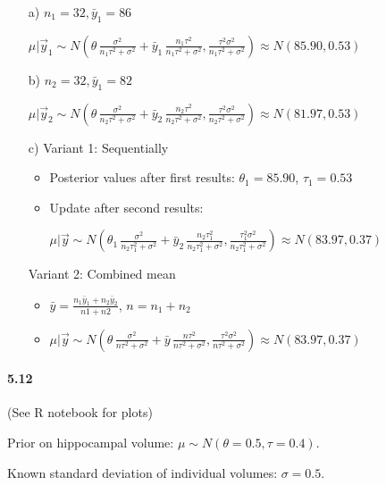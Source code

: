 \documentclass[fontsize=11pt,DIV=18,parskip=half]{scrartcl}
\begin{document}
\begin{enumerate}
\item[a)] $n_1 = 32, \bar{y}_1 = 86$

$\mu|\vec{y}_1 \sim N\left(\theta \, \frac{\sigma^2}{n_1\tau^2+\sigma^2} + \bar{y}_1 \, \frac{n_1 \tau^2}{n_1\tau^2+\sigma^2}, \frac{\tau^2 \sigma^2}{n_1\tau^2+\sigma^2}\right) \approx N\left(85.90, 0.53\right)$

\item[b)] $n_2 = 32, \bar{y}_1 = 82$

$\mu|\vec{y}_2 \sim N\left(\theta \, \frac{\sigma^2}{n_2\tau^2+\sigma^2} + \bar{y}_2 \, \frac{n_2 \tau^2}{n_2\tau^2+\sigma^2}, \frac{\tau^2 \sigma^2}{n_2\tau^2+\sigma^2}\right) \approx N\left(81.97, 0.53\right)$

\item[c)] Variant 1: Sequentially

\begin{itemize}
\item Posterior values after first results: $\theta_1=85.90$, $\tau_1=0.53$
\item Update after second results: 

$\mu|\vec{y} \sim N\left(\theta_1 \, \frac{\sigma^2}{n_2\tau_1^2+\sigma^2} + \bar{y}_2 \, \frac{n_2 \tau_1^2}{n_2\tau_1^2+\sigma^2}, \frac{\tau_1^2 \sigma^2}{n_2\tau_1^2+\sigma^2}\right) \approx N\left(83.97, 0.37\right)$
\end{itemize}

Variant 2: Combined mean

\begin{itemize}
\item $\bar{y} = \frac{n_1 \bar{y}_1 + n_2 \bar{y}_2}{n1+n2}$, $n = n_1 + n_2$
\item $\mu|\vec{y} \sim N\left(\theta \, \frac{\sigma^2}{n\tau^2+\sigma^2} + \bar{y} \, \frac{n \tau^2}{n\tau^2+\sigma^2}, \frac{\tau^2 \sigma^2}{n\tau^2+\sigma^2}\right) \approx N\left(83.97, 0.37\right)$
\end{itemize}
\end{enumerate}

\paragraph{5.12} (See R notebook for plots)

Prior on hippocampal volume: $\mu \sim  N( \theta=0.5, \tau=0.4)$.

Known standard deviation of individual volumes: $\sigma=0.5$.
\end{document}
